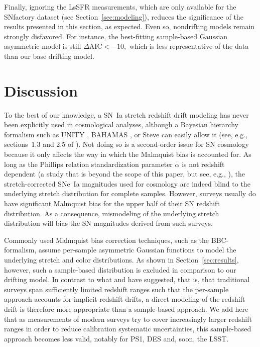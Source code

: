 \documentclass[]{aa}
\begin{document}
Finally, ignoring the LsSFR measurements, which are only available for the SNfactory
dataset (see Section~\ref{sec:modeling}), reduces the significance of the
results presented in this section, as expected. Even so, nondrifting
models remain strongly disfavored. For instance, the best-fitting sample-based Gaussian asymmetric model is still
$\Delta\mathrm{AIC}<-10,$ which is less representative of the data than our base drifting
model.

\section{Discussion}\label{sec:discussion}

To the best of our knowledge, a SN~Ia stretch redshift drift modeling has never
been explicitly used in cosmological analyses, although a Bayesian hierarchy
formalism such as UNITY \citep{rubin2015}, BAHAMAS \citep{shariff2016}, or Steve
\citep{hinton2019} can easily allow it (see, e.g., sections~1.3 and 2.5 of
\cite{rubin2015}). Not doing so is a second-order issue for SN cosmology because it
only affects the way in which the Malmquist bias is accounted for. As long as the
Phillips relation \citep{phillips1993} standardization parameter $\alpha$ is not
redshift dependent (a study that is beyond the scope of this paper, but see,
e.g., \citealt{scolnic2018a}), the stretch-corrected SNe~Ia magnitudes used for
cosmology are indeed blind to the underlying stretch distribution for complete samples.
However, surveys usually do have significant Malmquist bias for the upper half
of their SN redshift distribution. As a consequence, mismodeling of the
underlying stretch distribution will bias the SN magnitudes derived from such
surveys. 

Commonly used Malmquist bias correction techniques, such as the BBC-formalism,
assume per-sample asymmetric Gaussian functions to model the underlying
stretch and color distributions. As shown in Section~\ref{sec:results},
however, such a sample-based distribution is excluded in comparison to our
drifting model. In contrast to what \citet[][Section~2]{scolnic2016}
and \citet[][Section~5.4]{scolnic2018a} have suggested, that is, that
traditional surveys span sufficiently limited redshift ranges
such that the per-sample approach accounts for implicit redshift drifts,
a direct modeling of the redshift drift is therefore more appropriate than a
sample-based approach. We add here that as measurements of modern
surveys try to cover increasingly larger redshift ranges in order to reduce
calibration systematic uncertainties, this sample-based approach
becomes less valid, notably for PS1, DES and, soon, the LSST.
\end{document}
